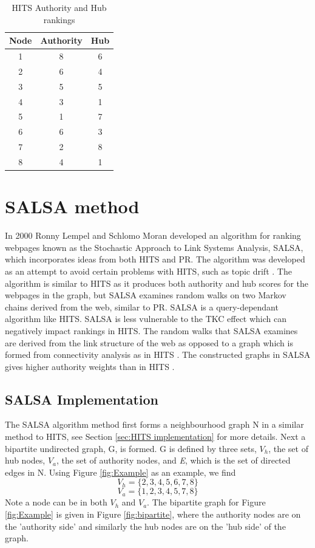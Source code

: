 \documentclass[11pt]{report}
\begin{document}
\begin{table}[h] \caption{HITS Authority and Hub rankings}
 \centering
 \begin{tabular} {c| c c} 
 Node & Authority & Hub \\ [0.5ex] 
 \hline
 1&8&6\\
 2&6&4\\
 3&5&5\\
 4&3&1\\
 5&1&7\\
 6&6&3\\
 7&2&8\\
 8&4&1\\
 \end{tabular}
 \label{Table:HITS}
 
\end{table}

\section{SALSA method} \label{sec:SALSA}
In 2000 Ronny Lempel and Schlomo Moran developed an algorithm for ranking webpages known as the Stochastic Approach to Link Systems Analysis, SALSA, which incorporates ideas from both HITS and PR. The algorithm was developed as an attempt to avoid certain problems with HITS, such as topic drift \cite{bonato}. The algorithm is similar to HITS as it produces both authority and hub scores for the webpages in the graph, but SALSA examines random walks on two Markov chains derived from the web, similar to PR. SALSA is a query-dependant algorithm like HITS. SALSA is less vulnerable to the TKC effect which can negatively impact rankings in HITS. The random walks that SALSA examines are derived from the link structure of the web as opposed to a graph which is formed from connectivity analysis as in HITS \cite{lempel2000stochastic}. The constructed graphs in SALSA gives higher authority weights than in HITS \cite{bonato}.

\subsection{SALSA Implementation}\label{sec:SALSA implementation}
The SALSA algorithm method first forms a neighbourhood graph N in a similar method to HITS, see Section \ref{sec:HITS implementation} for more details. Next a bipartite undirected graph, G, is formed. G is defined by three sets, $V_h$, the set of hub nodes, $V_a$, the set of authority nodes, and \textit{E}, which is the set of directed edges in N. Using Figure \ref{fig:Example} as an example, we find 
\[V_h = \{2,3,4,5,6,7,8\} \]
\[V_a = \{1,2,3,4,5,7,8\} \]
Note a node can be in both $V_h$ and $V_a$. The bipartite graph for Figure \ref{fig:Example} is given in Figure \ref{fig:bipartite}, where the authority nodes are on the 'authority side' and similarly the hub nodes are on the 'hub side' of the graph. 
\end{document}
